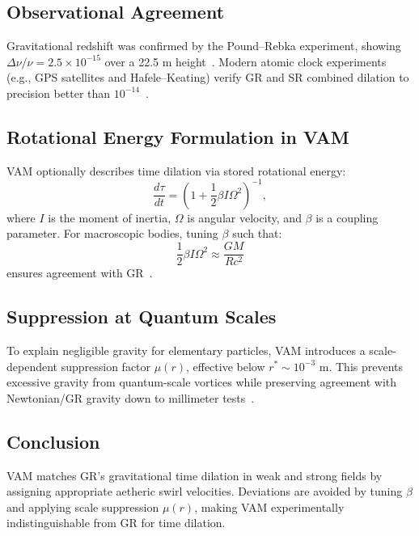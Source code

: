 \subsection*{Observational Agreement}
Gravitational redshift was confirmed by the Pound–Rebka experiment, showing $\Delta\nu/\nu = 2.5\times 10^{-15}$ over a 22.5 m height~\cite{pound1960apparent}. Modern atomic clock experiments (e.g., GPS satellites and Hafele–Keating) verify GR and SR combined dilation to precision better than $10^{-14}$~\cite{ashby2003relativity}.

\subsection*{Rotational Energy Formulation in VAM}
VAM optionally describes time dilation via stored rotational energy:
\[
    \frac{d\tau}{dt} = \left(1 + \frac{1}{2}\beta I \Omega^2\right)^{-1},
\]
where $I$ is the moment of inertia, $\Omega$ is angular velocity, and $\beta$ is a coupling parameter. For macroscopic bodies, tuning $\beta$ such that:
\[
    \frac{1}{2} \beta I \Omega^2 \approx \frac{GM}{Rc^2}
\]
ensures agreement with GR~\cite{grin3d2025}.

\subsection*{Suppression at Quantum Scales}
To explain negligible gravity for elementary particles, VAM introduces a scale-dependent suppression factor $\mu(r)$, effective below $r^* \sim 10^{-3}$ m. This prevents excessive gravity from quantum-scale vortices while preserving agreement with Newtonian/GR gravity down to millimeter tests~\cite{adelberger2003tests}.

\subsection*{Conclusion}
VAM matches GR's gravitational time dilation in weak and strong fields by assigning appropriate aetheric swirl velocities. Deviations are avoided by tuning $\beta$ and applying scale suppression $\mu(r)$, making VAM experimentally indistinguishable from GR for time dilation.
